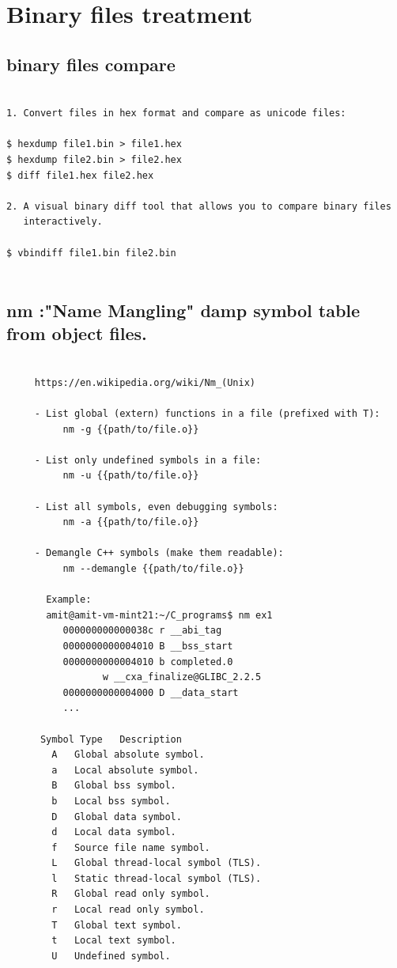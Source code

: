 \documentclass[a4paper,12pt]{article}
\begin{document}
\section{Binary files treatment }


\subsection{binary files compare}
\begin{verbatim}

1. Convert files in hex format and compare as unicode files:

$ hexdump file1.bin > file1.hex
$ hexdump file2.bin > file2.hex
$ diff file1.hex file2.hex

2. A visual binary diff tool that allows you to compare binary files       
   interactively.
   
$ vbindiff file1.bin file2.bin


\end{verbatim}

\subsection{nm      :"Name Mangling" damp symbol table from object files.}
\begin{verbatim}
     
     https://en.wikipedia.org/wiki/Nm_(Unix)
     
     - List global (extern) functions in a file (prefixed with T):
          nm -g {{path/to/file.o}}

     - List only undefined symbols in a file:
          nm -u {{path/to/file.o}}

     - List all symbols, even debugging symbols:
          nm -a {{path/to/file.o}}

     - Demangle C++ symbols (make them readable):
          nm --demangle {{path/to/file.o}}
       
       Example:
       amit@amit-vm-mint21:~/C_programs$ nm ex1
          000000000000038c r __abi_tag
          0000000000004010 B __bss_start
          0000000000004010 b completed.0
                 w __cxa_finalize@GLIBC_2.2.5
          0000000000004000 D __data_start
          ...

      Symbol Type	Description
        A	Global absolute symbol.
        a	Local absolute symbol.
        B	Global bss symbol.
        b	Local bss symbol.
        D	Global data symbol.
        d	Local data symbol.
        f	Source file name symbol.
        L	Global thread-local symbol (TLS).
        l	Static thread-local symbol (TLS).
        R	Global read only symbol.
        r	Local read only symbol.
        T	Global text symbol.
        t	Local text symbol.
        U	Undefined symbol.



\end{verbatim}
\end{document}
